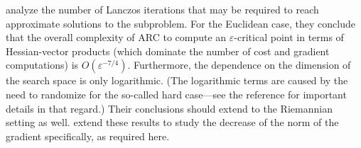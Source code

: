 \begin{remark} \label{rem:carmonduchisubproblem}
	\citet{carmon2018analysis} analyze the number of Lanczos iterations that may be required to reach approximate solutions to the subproblem. For the Euclidean case, they conclude that the overall complexity of ARC to compute an $\varepsilon$-critical point in terms of Hessian-vector products (which dominate the number of cost and gradient computations) is $O(\varepsilon^{-7/4})$. Furthermore, the dependence on the dimension of the search space is only logarithmic. (The logarithmic terms are caused by the need to randomize for the so-called hard case---see the reference for important details in that regard.)
	Their conclusions should extend to the Riemannian setting as well.
%	
	\citet{gould2019regularizedquadratic} extend these results to study the decrease of the norm of the gradient specifically, as required here.
\end{remark}


